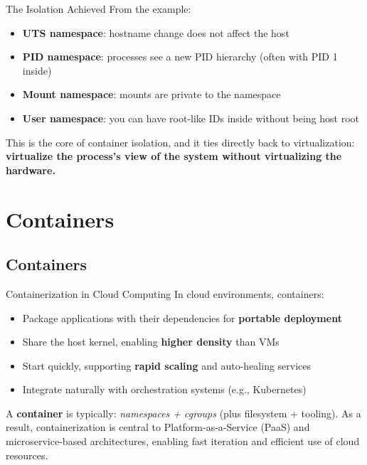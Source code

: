 \begin{frame}{The Isolation Achieved}
  From the example:
  \begin{itemize}
    \item \textbf{UTS namespace}: hostname change does not affect the host
    \item \textbf{PID namespace}: processes see a new PID hierarchy (often with PID 1 inside)
    \item \textbf{Mount namespace}: mounts are private to the namespace
    \item \textbf{User namespace}: you can have root-like IDs inside without being host root
  \end{itemize}

  \medskip
  This is the core of container isolation, and it ties directly back to virtualization:\\
  \textbf{virtualize the process's view of the system without virtualizing the hardware.}
\end{frame}

\section{Containers}
\subsection{Containers}

\begin{frame}{Containerization in Cloud Computing}
  In cloud environments, containers:
  \begin{itemize}
    \item Package applications with their dependencies for \textbf{portable deployment}
    \item Share the host kernel, enabling \textbf{higher density} than VMs
    \item Start quickly, supporting \textbf{rapid scaling} and auto-healing services
    \item Integrate naturally with orchestration systems (e.g., Kubernetes)
  \end{itemize}
  A \textbf{container} is typically: \textit{namespaces + cgroups} (plus filesystem + tooling).
  As a result, containerization is central to Platform-as-a-Service (PaaS) and microservice-based architectures, enabling fast iteration and efficient use of cloud resources.
\end{frame}

